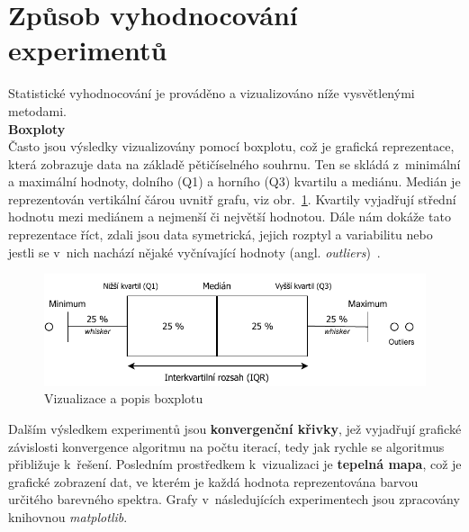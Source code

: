 \section{Způsob vyhodnocování experimentů}
Statistické vyhodnocování je prováděno a vizualizováno níže vysvětlenými metodami. \\

\noindent \textbf{Boxploty} 
\vspace{0.2cm} \\
Často jsou výsledky vizualizovány pomocí boxplotu, což je grafická reprezentace, která zobrazuje data na základě pětičíselného souhrnu. Ten se skládá z~minimální a maximální hodnoty, dolního (Q1) a horního (Q3) kvartilu a mediánu. Medián je reprezentován vertikální čárou uvnitř grafu, viz obr.~\ref{fig:boxplot}. Kvartily vyjadřují střední hodnotu mezi mediánem a nejmenší či největší hodnotou. Dále nám dokáže tato reprezentace říct, zdali jsou data symetrická, jejich rozptyl a variabilitu nebo jestli se v~nich nachází nějaké vyčnívající hodnoty (angl. \emph{outliers})~\cite{galarnyk_2022}.\\

\begin{figure}[!h]
    \centering
    \includegraphics[scale=0.95]{obrazky-figures/boxplot.pdf}
    \caption{Vizualizace a popis boxplotu}
    \label{fig:boxplot}
\end{figure}
 
Dalším výsledkem experimentů jsou \textbf{konvergenční křivky}, jež vyjadřují grafické závislosti konvergence algoritmu na počtu iterací, tedy jak rychle se algoritmus přibližuje k~řešení. Posledním prostředkem k~vizualizaci je \textbf{tepelná mapa}, což je grafické zobrazení dat, ve kterém je každá hodnota reprezentována barvou určitého barevného spektra. Grafy v~následujících experimentech jsou zpracovány knihovnou \emph{matplotlib}.\\ 

